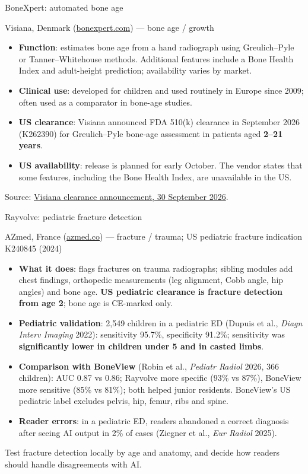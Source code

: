 \documentclass[aspectratio=169]{beamer}
\begin{document}
\begin{frame}[category=Commercial Software]{BoneXpert: automated bone age}
\relax
{\scriptsize Visiana, Denmark (\href{https://bonexpert.com/}{bonexpert.com}) --- bone age / growth\par}
\medskip
\small
\begin{itemize}
  \item \textbf{Function}: estimates bone age from a hand radiograph using Greulich--Pyle or Tanner--Whitehouse methods. Additional features include a Bone Health Index and adult-height prediction; availability varies by market.
  \item \textbf{Clinical use}: developed for children and used routinely in Europe since 2009; often used as a comparator in bone-age studies.
  \item \textbf{US clearance}: Visiana announced FDA 510(k) clearance in September 2026 (K262390) for Greulich--Pyle bone-age assessment in patients aged \textbf{2--21 years}.
  \item \textbf{US availability}: release is planned for early October. The vendor states that some features, including the Bone Health Index, are unavailable in the US.
\end{itemize}
\medskip
{\scriptsize Source: \href{https://bonexpert.com/2026/09/30/visiana-receives-fda510k-clearance-for-bonexpert-bone-age-software/}{Visiana clearance announcement, 30 September 2026}.}
\end{frame}

\begin{frame}[category=Commercial Software]{Rayvolve: pediatric fracture detection}
\relax
{\scriptsize AZmed, France (\href{https://www.azmed.co/}{azmed.co}) --- fracture / trauma; US pediatric fracture indication K240845 (2024)\par}
\medskip
\small
\begin{itemize}
  \item \textbf{What it does}: flags fractures on trauma radiographs; sibling modules add chest findings, orthopedic measurements (leg alignment, Cobb angle, hip angles) and bone age. \textbf{US pediatric clearance is fracture detection from age 2}; bone age is CE-marked only.
  \item \textbf{Pediatric validation}: 2,549 children in a pediatric ED (Dupuis et al., \textit{Diagn Interv Imaging} 2022): sensitivity 95.7\%, specificity 91.2\%; sensitivity was \textbf{significantly lower in children under 5 and in casted limbs}.
  \item \textbf{Comparison with BoneView} (Robin et al., \textit{Pediatr Radiol} 2026, 366 children): AUC 0.87 vs 0.86; Rayvolve more specific (93\% vs 87\%), BoneView more sensitive (85\% vs 81\%); both helped junior residents. BoneView's US pediatric label excludes pelvis, hip, femur, ribs and spine.
  \item \textbf{Reader errors}: in a pediatric ED, readers abandoned a correct diagnosis after seeing AI output in 2\% of cases (Ziegner et al., \textit{Eur Radiol} 2025).
\end{itemize}
\medskip
Test fracture detection locally by age and anatomy, and decide how readers should handle disagreements with AI.
\end{frame}
\end{document}
